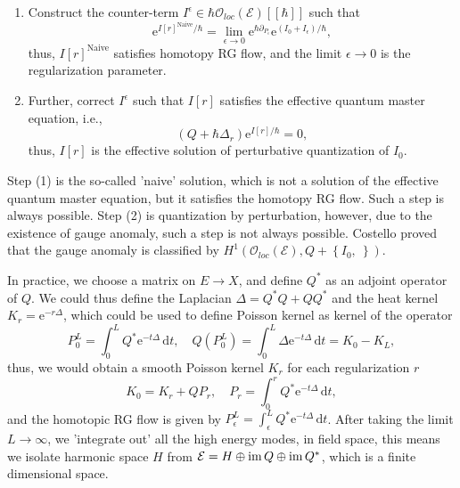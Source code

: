 \documentclass[10pt]{article}
\begin{document}
\begin{proposition}
  \begin{enumerate}[(1)]
    \item Construct the counter-term $ I^{\epsilon} \in \hbar \mathcal{O}_{loc}(\mathcal{E})[[\hbar]]$ such that
      \begin{equation*}
        \mathrm{e}^{I[r]^{\text{Naive}} / \hbar} = \lim_{\epsilon \to 0} \mathrm{e}^{\hbar \partial_{P_{\epsilon}}} \mathrm{e}^{(I_0 + I_{\epsilon})/ \hbar},
      \end{equation*}
      thus, $ I[r]^{\text{Naive}}$ satisfies homotopy RG flow, and the limit $ \epsilon \to 0$ is the regularization parameter.
    \item Further, correct $ I^{\epsilon}$  such that $ I[r]$ satisfies the effective quantum master equation, i.e.,
      \begin{equation*}
        (Q + \hbar \Delta_r) \mathrm{e}^{I[r] / \hbar} = 0,
      \end{equation*}
      thus, $ I[r]$ is the effective solution of perturbative quantization of $ I_0$.
  \end{enumerate}
  Step (1) is the so-called 'naive' solution, which is not a solution of the effective quantum master equation, but it satisfies the homotopy RG flow. Such a step is always possible.
  Step (2) is quantization by perturbation, however, due to the existence of gauge anomaly, such a step is not always possible. Costello proved that the gauge anomaly is classified by $ H^{1}(\mathcal{O}_{loc}(\mathcal{E}), Q + \left\{ I_0, ~ \right\})$.
\end{proposition}

In practice, we choose a matrix on $ E \rightarrow X$, and define $ Q^{*}$ as an adjoint operator of $ Q$. We could thus define the Laplacian $ \Delta = Q^{*}Q + Q Q^{*}$ and the heat kernel $ K_r = \mathrm{e}^{-r \Delta}$, which could be used to define Poisson kernel as kernel of the operator
\begin{equation*}
  P^{L}_{0} = \int _{0}^{L} Q^{*} \mathrm{e}^{- t \Delta} \, \mathrm{d} t, \quad Q \left( P^{L}_{0} \right) = \int _{0}^{L} \Delta \mathrm{e}^{- t \Delta} \, \mathrm{d} t = K_0 - K_L,
\end{equation*}
thus, we would obtain a smooth Poisson kernel $ K_r$ for each regularization $ r$
\begin{equation*}
  K_0 = K_r + Q P_r, \quad P_r = \int _{0}^{r} Q^{*} \mathrm{e}^{- t \Delta} \, \mathrm{d} t,
\end{equation*}
and the homotopic RG flow is given by $ P_{\epsilon}^{L} = \int _{\epsilon}^{L} Q^{*} \mathrm{e}^{- t \Delta} \, \mathrm{d} t$.
After taking the limit $ L \to \infty$, we 'integrate out' all the high energy modes, in field space, this means we isolate harmonic space $ H$ from $ \mathcal{E} = H \oplus \operatorname{im} Q \oplus \operatorname{im} Q^{*}$, which is a finite dimensional space.

\label{LastPage}
\end{document}
